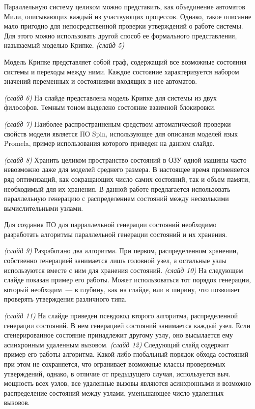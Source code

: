 \documentclass[a4paper,12pt,notitlepage]{article}
\begin{document}
Параллельную систему целиком можно представить, как объединение автоматов Мили,
описывающих каждый из участвующих процессов. Однако, такое описание мало пригодно для
непосредственной проверки утверждений о работе системы. Для этого можно использовать
другой способ ее формального представления, называемый моделью Крипке. \emph{(слайд 5)}

Модель Крипке представляет собой граф, содержащий все возможные состояния системы и
переходы между ними. Каждое состояние характеризуется набором значений переменных и
состояниями входящих в нее автоматов.

\emph{(слайд 6)} На слайде представлена модель Крипке для системы из двух
философов. Темным тоном выделено состояние взаимной блокировки.

\emph{(слайд 7)} Наиболее распространненым средством автоматической проверки свойств
модели является ПО Spin, использующее для описания моделей язык Promela, пример
использования которого приведен на данном слайде.

\emph{(слайд 8)} Хранить целиком пространство состояний в ОЗУ одной машины часто
невозможно даже для моделей среднего размера. В настоящее время применяется ряд
оптимизаций, как сокращающих число самих состояний, так и объем памяти, необходимый для их
хранения. В данной работе предлагается использовать параллельную генерацию с
распределением состояний между несколькими вычислительными узлами.

Для создания ПО для парраллельной генерации состояний необходимо разработать алгоритмы
параллельной генерации состояний и их хранения.

\emph{(слайд 9)} Разработано два алгоритма. При первом, распределенном хранении,
собственно генерацией занимается лишь головной узел, а остальные узлы используются вместе
с ним для хранения состояний. \emph{(слайд 10)} На следующем слайде показан пример его
работы. Может использоваться тот порядок генерации, который необходим~--- в глубину, как
на слайде, или в ширину, что позволяет проверять утверждения различного типа.

\emph{(слайд 11)} На слайде приведен псевдокод второго алгоритма, распределенной
генерации состояний. В нем генерацией состояний занимается каждый узел. Если
сгенерированное состояние принадлежит другому узлу, оно высылается ему асинхронным
удаленным вызовом. \emph{(слайд 12)} Следующий слайд содержит пример его работы
алгоритма. Какой-либо глобальный порядок обхода состояний при этом не сохраняется, что
огранивает возможные классы проверяемых утверждений, однако, в отличие от предыдущего
случая, используется выч. мощность всех узлов, все удаленные вызовы являются асинхронными
и возможно распределение состояний между узлами, уменьшающее число удаленных вызовов.
\end{document}
